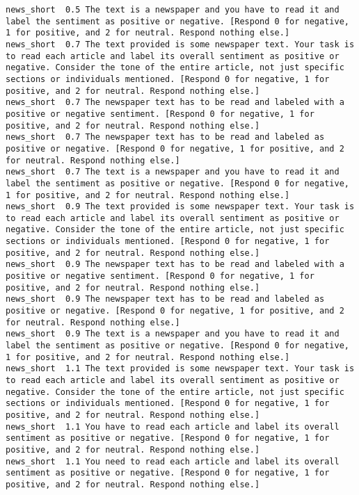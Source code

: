 \begin{lstlisting}[label=lst:promptvariants]
news_short	0.5	The text is a newspaper and you have to read it and label the sentiment as positive or negative. [Respond 0 for negative, 1 for positive, and 2 for neutral. Respond nothing else.]
news_short	0.7	The text provided is some newspaper text. Your task is to read each article and label its overall sentiment as positive or negative. Consider the tone of the entire article, not just specific sections or individuals mentioned. [Respond 0 for negative, 1 for positive, and 2 for neutral. Respond nothing else.]
news_short	0.7	The newspaper text has to be read and labeled with a positive or negative sentiment. [Respond 0 for negative, 1 for positive, and 2 for neutral. Respond nothing else.]
news_short	0.7	The newspaper text has to be read and labeled as positive or negative. [Respond 0 for negative, 1 for positive, and 2 for neutral. Respond nothing else.]
news_short	0.7	The text is a newspaper and you have to read it and label the sentiment as positive or negative. [Respond 0 for negative, 1 for positive, and 2 for neutral. Respond nothing else.]
news_short	0.9	The text provided is some newspaper text. Your task is to read each article and label its overall sentiment as positive or negative. Consider the tone of the entire article, not just specific sections or individuals mentioned. [Respond 0 for negative, 1 for positive, and 2 for neutral. Respond nothing else.]
news_short	0.9	The newspaper text has to be read and labeled with a positive or negative sentiment. [Respond 0 for negative, 1 for positive, and 2 for neutral. Respond nothing else.]
news_short	0.9	The newspaper text has to be read and labeled as positive or negative. [Respond 0 for negative, 1 for positive, and 2 for neutral. Respond nothing else.]
news_short	0.9	The text is a newspaper and you have to read it and label the sentiment as positive or negative. [Respond 0 for negative, 1 for positive, and 2 for neutral. Respond nothing else.]
news_short	1.1	The text provided is some newspaper text. Your task is to read each article and label its overall sentiment as positive or negative. Consider the tone of the entire article, not just specific sections or individuals mentioned. [Respond 0 for negative, 1 for positive, and 2 for neutral. Respond nothing else.]
news_short	1.1	You have to read each article and label its overall sentiment as positive or negative. [Respond 0 for negative, 1 for positive, and 2 for neutral. Respond nothing else.]
news_short	1.1	You need to read each article and label its overall sentiment as positive or negative. [Respond 0 for negative, 1 for positive, and 2 for neutral. Respond nothing else.]

\end{lstlisting}
